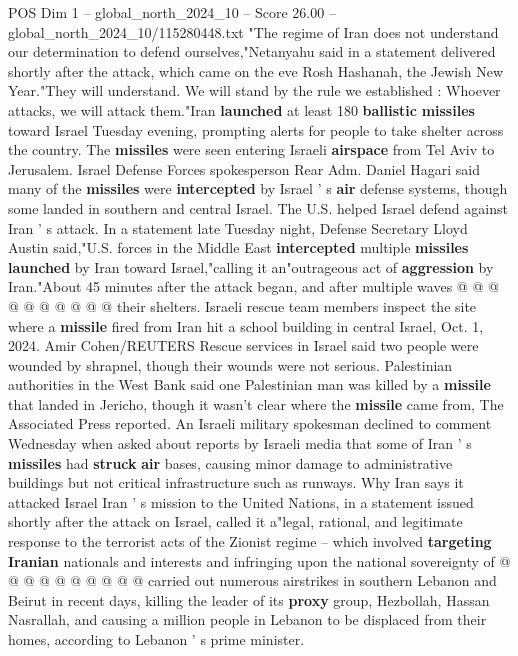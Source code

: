 \begin{textsample}{POS Dim 1 – global\_north\_2024\_10 – Score 26.00 – global\_north\_2024\_10/115280448.txt}  \label{ex:f1_pos_087}
"The regime of Iran does not understand our determination to defend ourselves,"Netanyahu said in a statement delivered shortly after the attack, which came on the eve Rosh Hashanah, the Jewish New Year."They will understand.
We will stand by the rule we established : Whoever attacks, we will attack them."Iran \textbf{launched} at least 180 \textbf{ballistic} \textbf{missiles} toward Israel Tuesday evening, prompting alerts for people to take shelter across the country.
The \textbf{missiles} were seen entering Israeli \textbf{airspace} from Tel Aviv to Jerusalem.
Israel Defense Forces spokesperson Rear Adm.
Daniel Hagari said many of the \textbf{missiles} were \textbf{intercepted} by Israel ' s \textbf{air} defense systems, though some landed in southern and central Israel.
The U.S. helped Israel defend against Iran ' s attack.
In a statement late Tuesday night, Defense Secretary Lloyd Austin said,"U.S. forces in the Middle East \textbf{intercepted} multiple \textbf{missiles} \textbf{launched} by Iran toward Israel,"calling it an"outrageous act of \textbf{aggression} by Iran."About 45 minutes after the attack began, and after multiple waves @ @ @ @ @ @ @ @ @ @ their shelters.
Israeli rescue team members inspect the site where a \textbf{missile} fired from Iran hit a school building in central Israel, Oct. 1, 2024.
Amir Cohen/REUTERS Rescue services in Israel said two people were wounded by shrapnel, though their wounds were not serious.
Palestinian authorities in the West Bank said one Palestinian man was killed by a \textbf{missile} that landed in Jericho, though it wasn't clear where the \textbf{missile} came from, The Associated Press reported.
An Israeli military spokesman declined to comment Wednesday when asked about reports by Israeli media that some of Iran ' s \textbf{missiles} had \textbf{struck} \textbf{air} bases, causing minor damage to administrative buildings but not critical infrastructure such as runways.
Why Iran says it attacked Israel Iran ' s mission to the United Nations, in a statement issued shortly after the attack on Israel, called it a"legal, rational, and legitimate response to the terrorist acts of the Zionist regime -- which involved \textbf{targeting} \textbf{Iranian} nationals and interests and infringing upon the national sovereignty of @ @ @ @ @ @ @ @ @ @ carried out numerous airstrikes in southern Lebanon and Beirut in recent days, killing the leader of its \textbf{proxy} group, Hezbollah, Hassan Nasrallah, and causing a million people in Lebanon to be displaced from their homes, according to Lebanon ' s prime minister.

\end{textsample}
